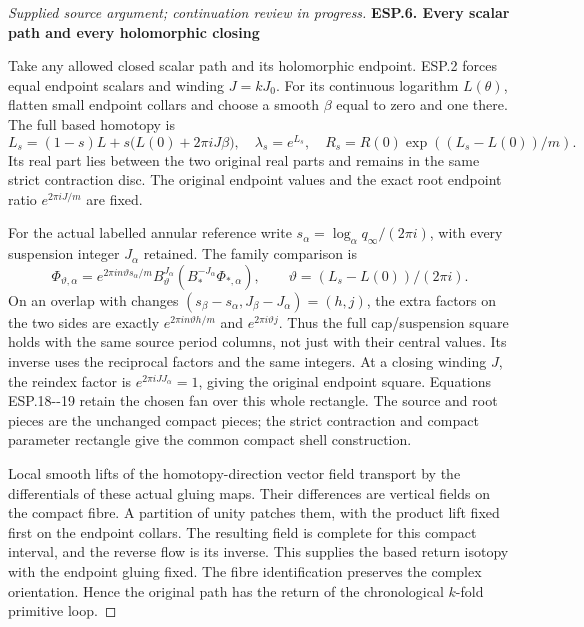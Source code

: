 \begin{proof}[Supplied source argument; continuation review in progress]
\par

\medskip\noindent\textbf{ESP.6. Every scalar path and every holomorphic closing}

\par\nobreak

Take any allowed closed scalar path and its holomorphic endpoint.
ESP.2 forces equal endpoint scalars and winding \(J=kJ_0\).
For its continuous logarithm \(L(\theta)\), flatten small endpoint
collars and choose a smooth \(\beta\) equal to zero and one there.
The full based homotopy is
\[
 L_s=(1-s)L+s\bigl(L(0)+2\pi iJ\beta\bigr),\quad
 \lambda_s=e^{L_s},\quad
 R_s=R(0)\exp((L_s-L(0))/m).
 \tag{ESP.32}
\]
Its real part lies between the two original real parts and remains
in the same strict contraction disc. The original endpoint values
and the exact root endpoint ratio \(e^{2\pi iJ/m}\) are fixed.

For the actual labelled annular reference write
\(s_\alpha=\log_\alpha q_\infty/(2\pi i)\), with every
suspension integer \(J_\alpha\) retained. The family comparison is
\[
 \Phi_{\vartheta,\alpha}
 =e^{2\pi in\vartheta s_\alpha/m}
 B_\vartheta^{J_\alpha}
           (B_*^{-J_\alpha}\Phi_{*,\alpha}),
 \qquad \vartheta=(L_s-L(0))/(2\pi i).
 \tag{ESP.33}
\]
On an overlap with changes \((s_\beta-s_\alpha,
J_\beta-J_\alpha)=(h,j)\), the extra factors on the two sides
are exactly \(e^{2\pi in\vartheta h/m}\) and
\(e^{2\pi i\vartheta j}\). Thus the full cap/suspension square
holds with the same source period columns, not just with their
central values. Its inverse uses the reciprocal factors and the
same integers. At a closing winding \(J\), the reindex factor
is \(e^{2\pi iJJ_\alpha}=1\), giving the original endpoint square.
Equations ESP.18-\/-19 retain the chosen fan over this whole
rectangle. The source and root pieces are the unchanged compact
pieces; the strict contraction and compact parameter rectangle
give the common compact shell construction.

Local smooth lifts of the homotopy-direction vector field transport
by the differentials of these actual gluing maps. Their differences
are vertical fields on the compact fibre. A partition of unity
patches them, with the product lift fixed first on the endpoint
collars. The resulting field is complete for this compact interval,
and the reverse flow is its inverse. This supplies the based return
isotopy with the endpoint gluing fixed. The fibre identification
preserves the complex orientation. Hence the original path has
the return of the chronological \(k\)-fold primitive loop.


\end{proof}
